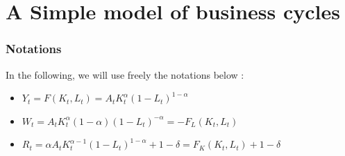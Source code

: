 \documentclass[12pt]{article}
\begin{document}
\newpage


\newpage


\section{A Simple model of business cycles}
\subsubsection*{Notations}
In the following, we will use freely the notations below :
\begin{itemize}
    \item $Y_t = F(K_t, L_t) = A_t K_t^{\alpha}(1 - L_t)^{1 - \alpha}$
    \item $W_t = A_t K_t^{\alpha} (1 - \alpha)(1 - L_t)^{-\alpha} = - F_L(K_t,L_t)$
    \item $R_t = \alpha A_t K_t^{\alpha -1 } (1 - L_t)^{1 - \alpha} + 1 - \delta = F_K(K_t, L_t) + 1 - \delta$
\end{itemize}
\end{document}
